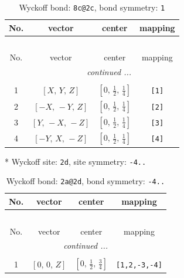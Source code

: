 \documentclass[fleqn,8pt]{jsarticle}
\begin{document}
\begin{longtable}{cccc}
\caption{Wyckoff bond: {\tt 8c@2c}, bond symmetry: {\tt 1}}
 \\
 \hline \hline
No. & vector & center & mapping \\ \hline \endfirsthead

\multicolumn{3}{l}{\tablename\ \thetable{}} \\
 \hline \hline
No. & vector & center & mapping \\ \hline \endhead

 \hline \hline
\multicolumn{3}{r}{\footnotesize\it continued ...} \\ \endfoot

 \hline \hline
\multicolumn{3}{r}{} \\ \endlastfoot

1 & $\left[ X,\, Y,\, Z \right]$ & $\left[ 0,\, \frac{1}{2},\, \frac{1}{4} \right]$ & {\tt [1]} \\ \hline
2 & $\left[ - X,\, - Y,\, Z \right]$ & $\left[ 0,\, \frac{1}{2},\, \frac{1}{4} \right]$ & {\tt [2]} \\ \hline
3 & $\left[ Y,\, - X,\, - Z \right]$ & $\left[ 0,\, \frac{1}{2},\, \frac{1}{4} \right]$ & {\tt [3]} \\ \hline
4 & $\left[ - Y,\, X,\, - Z \right]$ & $\left[ 0,\, \frac{1}{2},\, \frac{1}{4} \right]$ & {\tt [4]} \\
\end{longtable}
* Wyckoff site: {\tt 2d}, site symmetry: {\tt -4..}
\renewcommand{\arraystretch}{1.2}
\begin{longtable}{cccc}
\caption{Wyckoff bond: {\tt 2a@2d}, bond symmetry: {\tt -4..}}
 \\
 \hline \hline
No. & vector & center & mapping \\ \hline \endfirsthead

\multicolumn{3}{l}{\tablename\ \thetable{}} \\
 \hline \hline
No. & vector & center & mapping \\ \hline \endhead

 \hline \hline
\multicolumn{3}{r}{\footnotesize\it continued ...} \\ \endfoot

 \hline \hline
\multicolumn{3}{r}{} \\ \endlastfoot

1 & $\left[ 0,\, 0,\, Z \right]$ & $\left[ 0,\, \frac{1}{2},\, \frac{3}{4} \right]$ & {\tt [1,2,-3,-4]} \\
\end{longtable}
\end{document}
